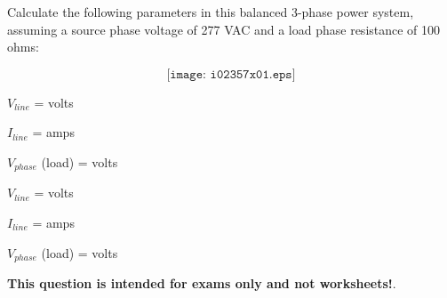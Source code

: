 

Calculate the following parameters in this balanced 3-phase power system, assuming a source phase voltage of 277 VAC and a load phase resistance of 100 ohms:

$$\texttt{[image: i02357x01.eps]}$$

$V_{line}$ = \underbar{\hskip 50pt} volts

\vskip 10pt

$I_{line}$ = \underbar{\hskip 50pt} amps

\vskip 10pt

$V_{phase}$ (load) = \underbar{\hskip 50pt} volts







$V_{line}$ =  volts

$I_{line}$ =  amps

$V_{phase}$ (load) =  volts







{\bf This question is intended for exams only and not worksheets!}.


